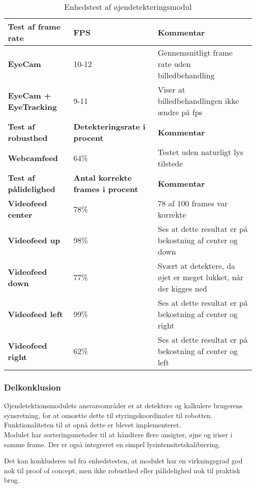 \begin{table}[H]
	\centering
	\begin{tabu} to 1 \textwidth { X[l,3]  X[l,2] X[l,3]}
		\hline
		\textbf{Test af frame rate}   	& \textbf{FPS} 	&  \textbf{Kommentar} \\
		\hline
		\textbf{EyeCam}   	& 10-12 	&  Gennemsnitligt frame rate uden billedbehandling \\
		\hdashline
		\textbf{EyeCam + EyeTracking}  	& 9-11 	&  Viser at billedbehandlingen ikke ændre på fps \\
		\hline
		\textbf{Test af robusthed} 	& \textbf{Detekteringsrate i procent} 	& \textbf{Kommentar} \\
		\hline
		\textbf{Webcamfeed}  	& 64\%	& Testet uden naturligt lys tilstede \\
		\hline
		
		\textbf{Test af pålidelighed}  	& \textbf{Antal korrekte frames i procent}	& \textbf{Kommentar} \\
		\hline
		\textbf{Videofeed center}  	&  78\%   	&  78 af 100 frames var korrekte \\
		\hdashline
		\textbf{Videofeed up}   	&  98\%    	&  Ses at dette resultat er på bekostning af center og down \\
		\hdashline
		\textbf{Videofeed down}   	& 77\%  	&  Svært at detektere, da øjet er meget lukket, når der kigges ned \\
		\hdashline
		\textbf{Videofeed left} 	&  99\% 	&  Ses at dette resultat er på bekostning af center og right \\
		\hdashline	
		\textbf{Videofeed right} & 62\% &  Ses at dette resultat er på bekostning af center og left \\ \hline
	\end{tabu}
	\caption{Enhedstest af øjendetekteringsmodul}
	\label{Enhedstest_oejendetekteringsmodul}
\end{table}


\subsubsection{Delkonklusion}
Øjendetektionsmodulets ansvarsområder er at detektere og kalkulere brugerens synsretning, for at omsætte dette til styringskoordinater til robotten. 
Funktionaliteten til at opnå dette er blevet implementeret.\\ 
Modulet har sorteringsmetoder til at håndtere flere ansigter, øjne og iriser i samme frame. 
Der er også integreret en simpel lysintensitetskalibrering.

Det kan konkluderes ud fra enhedstesten, at modulet har en virkningsgrad god nok til proof of concept, men ikke robusthed eller pålidelighed nok til praktisk brug.  

%
